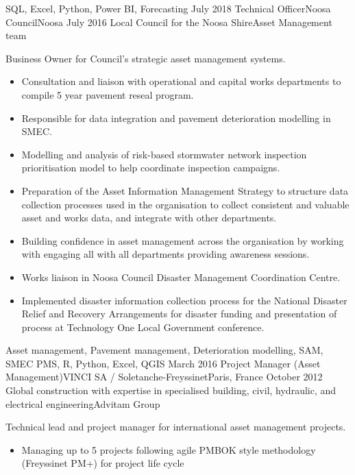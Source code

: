 \begin{experiences}
{\begin{itemize}
                      \end{itemize}
                    }
                    {SQL, Excel, Python, Power BI, Forecasting}
  \emptySeparator
  \consultantexperience
    {July 2018} {Technical Officer}{Noosa Council}{Noosa}
    {July 2016}   {Local Council for the Noosa Shire}{Asset Management team}
      {Business Owner for Council's strategic asset management systems.
                      \begin{itemize}
		\item Consultation and liaison with operational and capital works departments to compile 5 year pavement reseal program.
		\item Responsible for data integration and pavement deterioration modelling in SMEC.
		\item Modelling and analysis of risk-based stormwater network inspection prioritisation model to help coordinate inspection campaigns.
		\item Preparation of the Asset Information Management Strategy to structure data collection processes used in the organisation to collect consistent and valuable asset and works data, and integrate with other departments.
		\item Building confidence in asset management across the organisation by working with engaging all with all departments providing awareness sessions.
		\item Works liaison in Noosa Council Disaster Management Coordination Centre.
		\item Implemented disaster information collection process for the National Disaster Relief and Recovery Arrangements for disaster funding and presentation of process at Technology One Local Government conference.                                
                      \end{itemize}
                    }
                    {Asset management, Pavement management, Deterioration modelling, SAM, SMEC PMS, R, Python, Excel, QGIS}
  \emptySeparator
  \consultantexperience
    {March 2016}     {Project Manager (Asset Management)}{VINCI SA / Soletanche-Freyssinet}{Paris, France}
    {October 2012}   {Global construction with expertise in specialised building, civil, hydraulic, and electrical engineering}{Advitam Group}
      {Technical lead and project manager for international asset management projects.
                      \begin{itemize}
                     \item Managing up to 5 projects following agile PMBOK style methodology (Freyssinet PM+) for project life cycle

\end{itemize}}
\end{experiences}
